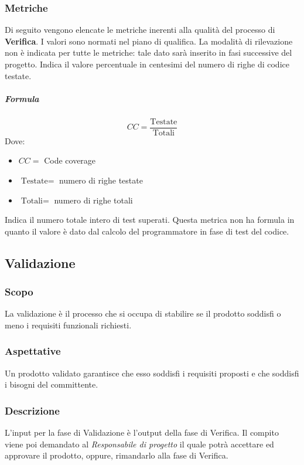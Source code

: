 	\subsubsection{Metriche}
	Di seguito vengono elencate le metriche inerenti alla qualità del processo di \textbf{Verifica}. I valori sono normati nel piano di qualifica. La modalità di rilevazione non è indicata per tutte le metriche: tale dato sarà inserito in fasi successive del progetto.
        Indica il valore percentuale in centesimi del numero di righe di codice testate.
        \subparagraph{Formula}
        \begin{displaymath}
          CC = \frac{\textrm{Testate}}{\textrm{Totali}}
        \end{displaymath}
        Dove:
        \begin{itemize}
        \item[] $CC =$ Code coverage
        \item[] $\textrm{Testate} =$ numero di righe testate
        \item[] $\textrm{Totali} =$ numero di righe totali
        \end{itemize}
        
        
        Indica il numero totale intero di test superati. Questa metrica non ha formula in quanto il valore è dato dal calcolo del programmatore in fase di test del codice.
	
	\subsection{Validazione}

	\subsubsection{Scopo}
	La validazione è il processo che si occupa di stabilire se il prodotto soddisfi o meno i requisiti funzionali richiesti. 
	
	\subsubsection{Aspettative}
		Un prodotto validato garantisce che esso soddisfi i requisiti proposti e che soddisfi i bisogni del committente.
	
	\subsubsection{Descrizione}
	L'input per la fase di Validazione è l'output della fase di Verifica. Il compito viene poi demandato al \textit{Responsabile di progetto} il quale potrà accettare ed approvare il prodotto, oppure, rimandarlo alla fase di Verifica.
